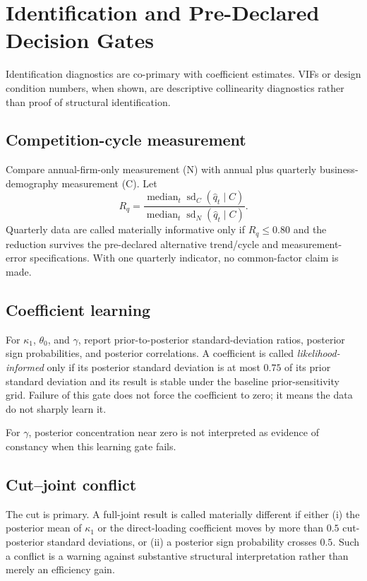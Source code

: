 \documentclass[11pt]{article}
\begin{document}
\section{Identification and Pre-Declared Decision Gates}

Identification diagnostics are co-primary with coefficient estimates. VIFs or design condition numbers, when shown, are descriptive collinearity diagnostics rather than proof of structural identification.

\subsection{Competition-cycle measurement}
Compare annual-firm-only measurement (N) with annual plus quarterly business-demography measurement (C). Let
\begin{equation}
R_q=\frac{\operatorname{median}_t\operatorname{sd}_C(\hat q_t\mid C)}
{\operatorname{median}_t\operatorname{sd}_N(\hat q_t\mid C)}.
\end{equation}
Quarterly data are called materially informative only if $R_q\le0.80$ and the reduction survives the pre-declared alternative trend/cycle and measurement-error specifications. With one quarterly indicator, no common-factor claim is made.

\subsection{Coefficient learning}
For $\kappa_1$, $\theta_0$, and $\gamma$, report prior-to-posterior standard-deviation ratios, posterior sign probabilities, and posterior correlations. A coefficient is called \emph{likelihood-informed} only if its posterior standard deviation is at most $0.75$ of its prior standard deviation and its result is stable under the baseline prior-sensitivity grid. Failure of this gate does not force the coefficient to zero; it means the data do not sharply learn it.

For $\gamma$, posterior concentration near zero is not interpreted as evidence of constancy when this learning gate fails.

\subsection{Cut--joint conflict}
The cut is primary. A full-joint result is called materially different if either (i) the posterior mean of $\kappa_1$ or the direct-loading coefficient moves by more than $0.5$ cut-posterior standard deviations, or (ii) a posterior sign probability crosses $0.5$. Such a conflict is a warning against substantive structural interpretation rather than merely an efficiency gain.
\end{document}
